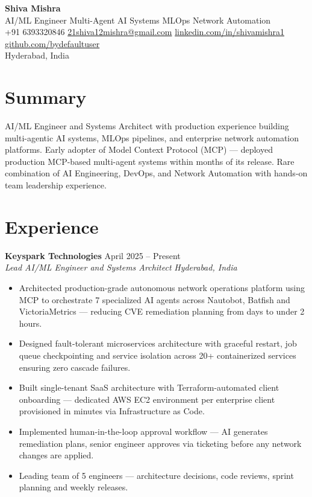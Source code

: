 \documentclass[letterpaper,11pt]{article}
\newcommand{\resumeitem}[1]{\item #1}
\newcommand{\entry}[4]{%
  \noindent
  \textbf{#1} \hfill #2 \\
  \textit{#3} \hfill \textit{#4} \par
}
\begin{document}
\begin{center}
  {\Huge\bfseries Shiva Mishra} \\[4pt]
  AI/ML Engineer \textbar{} Multi-Agent AI Systems \textbar{} MLOps \textbar{} Network Automation \\[4pt]
  +91 6393320846 \quad\textbar\quad
  \href{mailto:21shiva12mishra@gmail.com}{21shiva12mishra@gmail.com} \quad\textbar\quad
  \href{https://linkedin.com/in/shivamishra1}{linkedin.com/in/shivamishra1} \quad\textbar\quad
  \href{https://github.com/bydefaultuser}{github.com/bydefaultuser} \\[2pt]
  Hyderabad, India
\end{center}

\section{Summary}

AI/ML Engineer and Systems Architect with production experience building multi-agentic AI systems,
MLOps pipelines, and enterprise network automation platforms. Early adopter of Model Context Protocol
(MCP) --- deployed production MCP-based multi-agent systems within months of its release. Rare
combination of AI Engineering, DevOps, and Network Automation with hands-on team leadership experience.

\section{Experience}

\entry{Keyspark Technologies}{April 2025 -- Present}{Lead AI/ML Engineer and Systems Architect}{Hyderabad, India}
\begin{itemize}
  \resumeitem{Architected production-grade autonomous network operations platform using MCP to
              orchestrate 7 specialized AI agents across Nautobot, Batfish and VictoriaMetrics
              --- reducing CVE remediation planning from days to under 2 hours.}
  \resumeitem{Designed fault-tolerant microservices architecture with graceful restart, job queue
              checkpointing and service isolation across 20+ containerized services ensuring zero
              cascade failures.}
  \resumeitem{Built single-tenant SaaS architecture with Terraform-automated client onboarding ---
              dedicated AWS EC2 environment per enterprise client provisioned in minutes via
              Infrastructure as Code.}
  \resumeitem{Implemented human-in-the-loop approval workflow --- AI generates remediation plans,
              senior engineer approves via ticketing before any network changes are applied.}
  \resumeitem{Leading team of 5 engineers --- architecture decisions, code reviews, sprint planning
              and weekly releases.}
\end{itemize}
\end{document}
